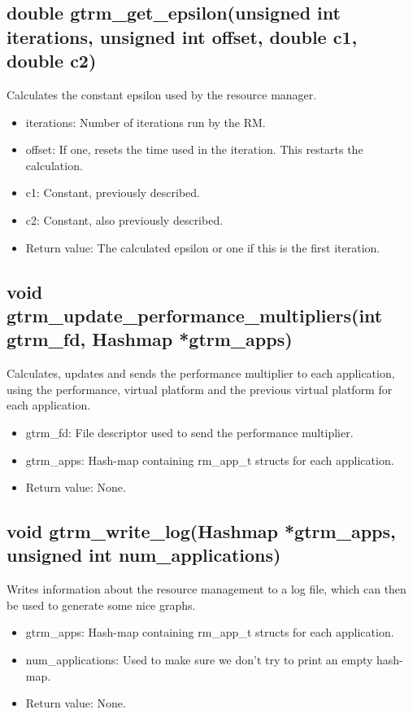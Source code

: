 \documentclass[nobiblatex]{LTHthesis}
\begin{document}
\subsection{double gtrm\_get\_epsilon(unsigned int iterations, unsigned int offset, double c1, double c2)}
Calculates the constant epsilon used by the resource manager.
\begin{itemize} 
\item iterations: Number of iterations run by the RM.
\item offset: If one, resets the time used in the iteration. This restarts the calculation.
\item c1: Constant, previously described.
\item c2: Constant, also previously described.
\item Return value: The calculated epsilon or one if this is the first iteration.
\end{itemize}

\subsection{void gtrm\_update\_performance\_multipliers(int gtrm\_fd, Hashmap *gtrm\_apps)}
Calculates, updates and sends the performance multiplier to each application, using the performance, virtual platform and the previous virtual platform for each application.
\begin{itemize} 
\item gtrm\_fd: File descriptor used to send the performance multiplier.
\item gtrm\_apps: Hash-map containing rm\_app\_t structs for each application.
\item Return value: None.
\end{itemize}

\subsection{void gtrm\_write\_log(Hashmap *gtrm\_apps, unsigned int num\_applications)}
Writes information about the resource management to a log file, which can then be used to generate some nice graphs.
\begin{itemize} 
\item gtrm\_apps: Hash-map containing rm\_app\_t structs for each application.
\item num\_applications: Used to make sure we don't try to print an empty hash-map.
\item Return value: None.
\end{itemize}
\end{document}
